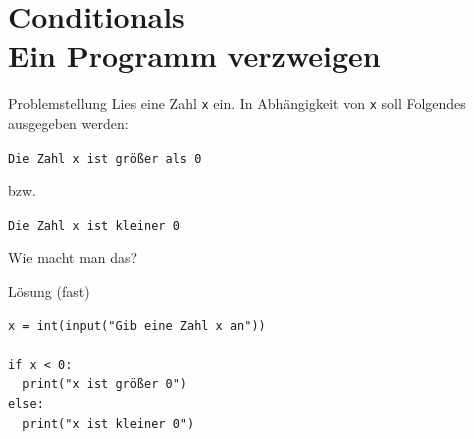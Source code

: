 \documentclass[algorithm,pgfplots,colortheme=dark]{cuzbeamer}
\newcommand{\py}[1]{\texttt{#1}}
\begin{document}
\section{Conditionals \\ \footnotesize Ein Programm verzweigen}

\begin{frame}
	\begin{block}{Problemstellung}
		\vspace{2pt}
		Lies eine Zahl \py{x} ein. In Abhängigkeit von \py{x} soll Folgendes ausgegeben werden: 
		
		\texttt{Die Zahl x ist größer als 0} 
		
		bzw. 
		
		\texttt{Die Zahl x ist kleiner 0}  
		\vspace{8pt}
		
		Wie macht man das?
		\end{block}
\end{frame}

\begin{fragile}
	
\begin{block}{Lösung \footnotesize(fast)}
\begin{verbatim}
x = int(input("Gib eine Zahl x an"))

if x < 0:
  print("x ist größer 0")
else:
  print("x ist kleiner 0")
\end{verbatim}
\end{block}
	
\end{fragile}
\end{document}
